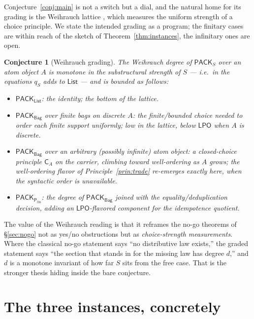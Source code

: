 \documentclass[11pt]{article}
\theoremstyle{definition}
\theoremstyle{plain}
\newtheorem{conjecture}[definition]{Conjecture}
\newcommand{\Coll}{S}
\newcommand{\List}{\mathsf{List}}
\newcommand{\Mset}{\mathsf{Bag}}
\newcommand{\Pfin}{\mathsf{P}_{\mathrm{fin}}}
\newcommand{\Pack}{\mathsf{PACK}}
\newcommand{\qmap}{q}
\begin{document}
Conjecture~\ref{conj:main} is not a switch but a dial, and the natural home
for its grading is the Weihrauch lattice \cite{BrattkaGherardi11}, which
measures the uniform strength of a choice principle. We state the intended
grading as a program; the finitary cases are within reach of the sketch of
Theorem~\ref{thm:instances}, the infinitary ones are open.

\begin{conjecture}[Weihrauch grading]
\label{conj:weihrauch}
The Weihrauch degree of $\Pack_{\Coll}$ over an atom object $A$ is monotone in
the substructural strength of $\Coll$ --- i.e.\ in the equations
$\qmap_{\Coll}$ adds to $\List$ --- and is bounded as follows:
\begin{itemize}[leftmargin=1.4em]
\item $\Pack_{\List}$: the identity; the bottom of the lattice.
\item $\Pack_{\Mset}$ over finite bags on discrete $A$: the finite/bounded
      choice needed to order each finite support uniformly; low in the
      lattice, below $\mathsf{LPO}$ when $A$ is discrete.
\item $\Pack_{\Mset}$ over an arbitrary (possibly infinite) atom object: a
      closed-choice principle $\mathsf{C}_{A}$ on the carrier, climbing toward
      well-ordering as $A$ grows; the well-ordering flavor of
      Principle~\ref{prin:trade} re-emerges exactly here, when the syntactic
      order is unavailable.
\item $\Pack_{\Pfin}$: the degree of $\Pack_{\Mset}$ joined with the
      equality/deduplication decision, adding an $\mathsf{LPO}$-flavored
      component for the idempotence quotient.
\end{itemize}
\end{conjecture}

The value of the Weihrauch reading is that it reframes the no-go theorems of
\S\ref{sec:nogo} not as yes/no obstructions but as \emph{choice-strength
measurements}. Where the classical no-go statement says ``no distributive law
exists,'' the graded statement says ``the section that stands in for the
missing law has degree $d$,'' and $d$ is a monotone invariant of how far
$\Coll$ sits from the free case. That is the stronger thesis hiding inside the
bare conjecture.

\section{The three instances, concretely}
\label{sec:instances}
\end{document}
